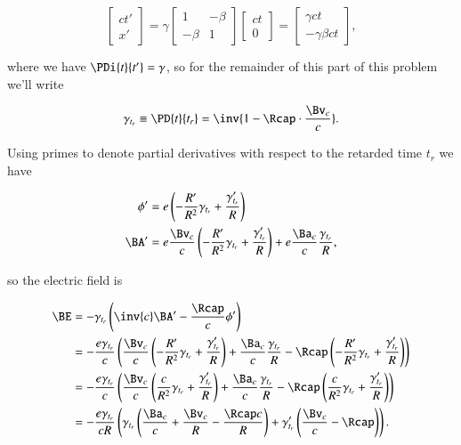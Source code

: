 \begin{equation}\label{eqn:relElectroDynProblemSet5:260}
\begin{bmatrix}
c t' \\
x'
\end{bmatrix}
=
\gamma
\begin{bmatrix}
1 & -\beta \\
-\beta & 1
\end{bmatrix}
\begin{bmatrix}
c t \\
0
\end{bmatrix}
= 
\begin{bmatrix}
\gamma c t \\
-\gamma \beta c t
\end{bmatrix},
\end{equation}

where we have $\PDi{t}{t'} = \gamma$, so for the remainder of this part of this problem we'll write

\begin{equation}\label{eqn:relElectroDynProblemSet5:280}
\gamma_{t_r} \equiv \PD{t}{t_r} = \inv{ 1 -\Rcap \cdot \frac{\Bv_c}{c} }.
\end{equation}

Using primes to denote partial derivatives with respect to the retarded time $t_r$ we have

\begin{align}\label{eqn:relElectroDynProblemSet5:490}
\phi' &= e \left( -\frac{R'}{R^2} \gamma_{t_r} + \frac{\gamma_{t_r}'}{R} \right) \\
\BA' &= e \frac{\Bv_c}{c} \left( -\frac{R'}{R^2} \gamma_{t_r} + \frac{\gamma_{t_r}'}{R} \right)
+ e \frac{\Ba_c}{c} \frac{\gamma_{t_r}}{R},
\end{align}

so the electric field is

\begin{align*}
\BE 
&= - \gamma_{t_r} \left( \inv{c} \BA' - \frac{\Rcap}{c} \phi' \right) \\
&= - \frac{e \gamma_{t_r}}{c} \left( 
\frac{\Bv_c}{c} \left( -\frac{R'}{R^2} \gamma_{t_r} + \frac{\gamma_{t_r}'}{R} \right)
+ \frac{\Ba_c}{c} \frac{\gamma_{t_r}}{R}
- \Rcap \left( -\frac{R'}{R^2} \gamma_{t_r} + \frac{\gamma_{t_r}'}{R} \right) 
\right) \\
&= - \frac{e \gamma_{t_r}}{c} \left( 
\frac{\Bv_c}{c} \left( \frac{c}{R^2} \gamma_{t_r} + \frac{\gamma_{t_r}'}{R} \right)
+ \frac{\Ba_c}{c} \frac{\gamma_{t_r}}{R}
- \Rcap \left( \frac{c}{R^2} \gamma_{t_r} + \frac{\gamma_{t_r}'}{R} \right) 
\right) \\
&= - \frac{e \gamma_{t_r}}{c R} \left( \gamma_{t_r} \left( 
\frac{\Ba_c}{c} 
+\frac{\Bv_c}{R} 
- \frac{\Rcap c}{R}
\right)
+ \gamma_{t_r}' \left( \frac{\Bv_c}{c} - \Rcap \right)
\right).
\end{align*}

